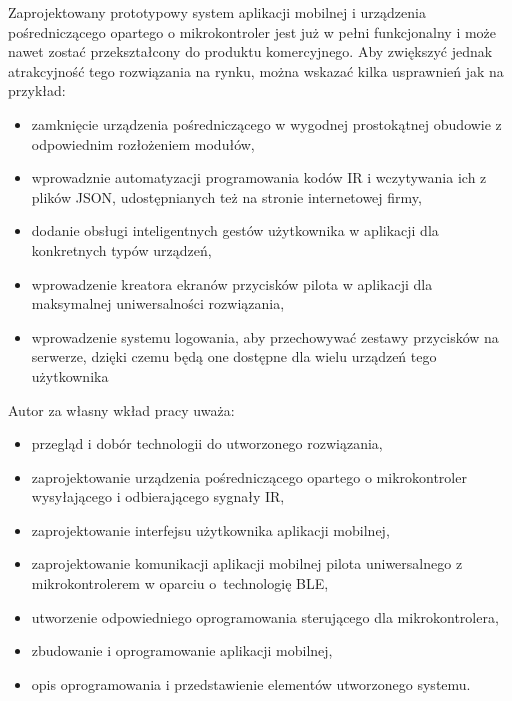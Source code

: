 \documentclass[12pt,twoside]{article}
\begin{document}
Zaprojektowany prototypowy system aplikacji mobilnej i urządzenia pośredniczącego opartego o mikrokontroler jest już w pełni funkcjonalny i może nawet zostać przekształcony do produktu komercyjnego. Aby zwiększyć jednak atrakcyjność tego rozwiązania na rynku, można wskazać kilka usprawnień jak na przykład:
\begin{itemize}[label=-,labelsep=0.4cm,leftmargin=0.65cm]
   \item zamknięcie urządzenia pośredniczącego w wygodnej prostokątnej obudowie z odpowiednim rozłożeniem modułów,
   \item wprowadznie automatyzacji programowania kodów IR i wczytywania ich z plików JSON, udostępnianych też na stronie internetowej firmy,
   \item dodanie obsługi inteligentnych gestów użytkownika w aplikacji dla konkretnych typów urządzeń,
   \item wprowadzenie kreatora ekranów przycisków pilota w aplikacji dla maksymalnej uniwersalności rozwiązania,
   \item wprowadzenie systemu logowania, aby przechowywać zestawy przycisków na serwerze, dzięki czemu będą one dostępne dla wielu urządzeń tego użytkownika
   
\end{itemize}

Autor za własny wkład pracy uważa: 
\begin{itemize}[label=-,labelsep=0.4cm,leftmargin=0.65cm]
   \item przegląd i dobór technologii do utworzonego rozwiązania,
   \item zaprojektowanie urządzenia pośredniczącego opartego o mikrokontroler wysyłającego i odbierającego sygnały IR,
   \item zaprojektowanie interfejsu użytkownika aplikacji mobilnej,
   \item zaprojektowanie komunikacji aplikacji mobilnej pilota uniwersalnego z mikrokontrolerem w oparciu o~technologię BLE,
   \item utworzenie odpowiedniego oprogramowania sterującego dla mikrokontrolera,
   \item zbudowanie i oprogramowanie aplikacji mobilnej,
   \item opis oprogramowania i przedstawienie elementów utworzonego systemu.
   
\end{itemize}

\clearpage
{}



\clearpage

\makesummary
\end{document}
